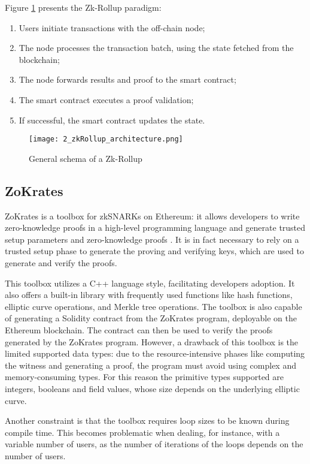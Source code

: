 Figure \ref{fig:2_zkRollup_schema} presents the Zk-Rollup paradigm: 
\begin{enumerate}
  \item Users initiate transactions with the off-chain node;
  \item The node processes the transaction batch, using the state fetched from the blockchain;
  \item The node forwards results and proof to the smart contract;
  \item The smart contract executes a proof validation;
  \item If successful, the smart contract updates the state.
\end{enumerate}

\begin{figure}[ht]
  \centering
  \texttt{[image: 2\_zkRollup\_architecture.png]}
  \caption[Zk-Rollup Schema]{General schema of a Zk-Rollup\cite{ise_department_tub_material_nodate}}  
  \label{fig:2_zkRollup_schema}
\end{figure}

\subsection{ZoKrates}
ZoKrates is a toolbox for zkSNARKs on Ethereum: it allows developers to write zero-knowledge proofs in a high-level programming language and generate trusted setup parameters and zero-knowledge proofs \cite{eberhardt_ZoKrates_2018}. It is in fact necessary to rely on a trusted setup phase to generate the proving and verifying keys, which are used to generate and verify the proofs.

This toolbox utilizes a C++ language style, facilitating developers adoption. It also offers a built-in library with frequently used functions like hash functions, elliptic curve operations, and Merkle tree operations. The toolbox is also capable of generating a Solidity contract from the ZoKrates program, deployable on the Ethereum blockchain. The contract can then be used to verify the proofs generated by the ZoKrates program. However, a drawback of this toolbox is the limited supported data types: due to the resource-intensive phases like computing the witness and generating a proof, the program must avoid using complex and memory-consuming types. For this reason the primitive types supported are integers, booleans and field values, whose size depends on the underlying elliptic curve.

Another constraint is that the toolbox requires loop sizes to be known during compile time. This becomes problematic when dealing, for instance, with a variable number of users, as the number of iterations of the loops depends on the number of users.

